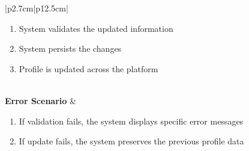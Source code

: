 \begin{table}[H]
\begin{tabular}{|p{2.7cm}|p{12.5cm}|}
\begin{minipage}[t]{\linewidth}
\begin{enumerate}[topsep=0pt,itemsep=1pt,parsep=0pt,partopsep=0pt]
                                              \item System validates the updated information
                                              \item System persists the changes
                                              \item Profile is updated across the platform
                                          \end{enumerate}
                                      \end{minipage}                    \\
            \hline
            \textbf{Error Scenario} & \begin{minipage}[t]{\linewidth}
                                          \begin{enumerate}[topsep=0pt,itemsep=1pt,parsep=0pt,partopsep=0pt]
                                              \item If validation fails, the system displays specific error messages
                                              \item If update fails, the system preserves the previous profile data
                                          \end{enumerate}
                                      \end{minipage}            \\
            \hline
        \end{tabular}
        \label{tab:eng-edit-profile}
    \end{table}
